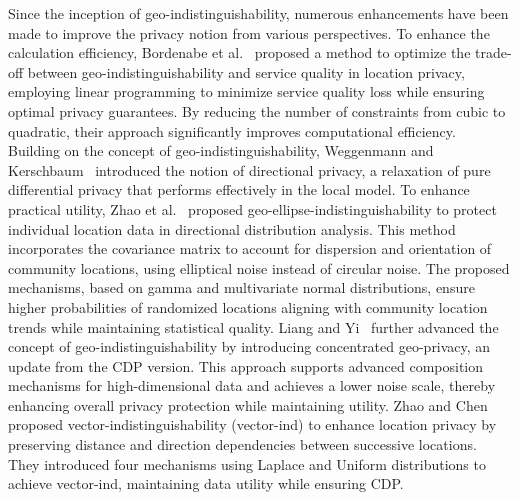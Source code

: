 Since the inception of geo-indistinguishability, numerous enhancements have been made to improve the privacy notion from various perspectives.
To enhance the calculation efficiency, Bordenabe et al.~\cite{bordenabe2014optimal} proposed a method to optimize the trade-off between geo-indistinguishability and service quality in location privacy, employing linear programming to minimize service quality loss while ensuring optimal privacy guarantees. By reducing the number of constraints from cubic to quadratic, their approach significantly improves computational efficiency.
Building on the concept of geo-indistinguishability, Weggenmann and Kerschbaum~\cite{weggenmann2021differential} introduced the notion of directional privacy, a relaxation of pure differential privacy that performs effectively in the local model. 
To enhance practical utility, Zhao et al.~\cite{zhao2022geo} proposed geo-ellipse-indistinguishability to protect individual location data in directional distribution analysis. This method incorporates the covariance matrix to account for dispersion and orientation of community locations, using elliptical noise instead of circular noise. The proposed mechanisms, based on gamma and multivariate normal distributions, ensure higher probabilities of randomized locations aligning with community location trends while maintaining statistical quality.
Liang and Yi~\cite{liang2023concentrated} further advanced the concept of geo-indistinguishability by introducing concentrated geo-privacy, an update from the CDP version. This approach supports advanced composition mechanisms for high-dimensional data and achieves a lower noise scale, thereby enhancing overall privacy protection while maintaining utility. Zhao and Chen~\cite{zhao2023vector} proposed vector-indistinguishability (vector-ind) to enhance location privacy by preserving distance and direction dependencies between successive locations. They introduced four mechanisms using Laplace and Uniform distributions to achieve vector-ind, maintaining data utility while ensuring CDP.

